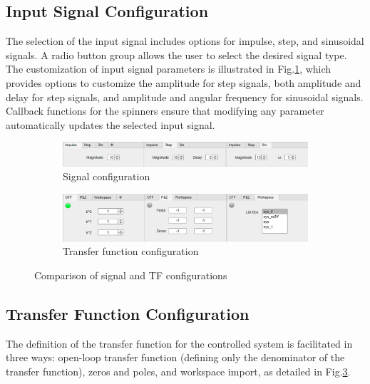 \documentclass[journal,twoside,web]{ieeecolor}
\begin{document}
\subsection{Input Signal Configuration}
The selection of the input signal includes options for impulse, step, and sinusoidal signals. A radio button group allows the user to select the desired signal type. The customization of input signal parameters is illustrated in Fig.\ref{fig:signal_config}, which provides options to customize the amplitude for step signals, both amplitude and delay for step signals, and amplitude and angular frequency for sinusoidal signals. Callback functions for the spinners ensure that modifying any parameter automatically updates the selected input signal.

\begin{figure}[!ht]
    \centering
    \begin{subfigure}[b]{0.5\textwidth}
        \centering
        \includegraphics[width=\textwidth]{Images/Signal Config2.jpg}
        \caption{Signal configuration}
        \label{fig:signal_config}
    \end{subfigure}%
    \hfill %
    \begin{subfigure}[b]{0.5\textwidth}
        \centering
        \includegraphics[width=\textwidth]{Images/TF Config.jpg}
        \caption{Transfer function configuration}
        \label{fig:tf_config}
    \end{subfigure}
    \caption{Comparison of signal and TF configurations}
    \label{fig:configs}
\end{figure}

\subsection{Transfer Function Configuration}
The definition of the transfer function for the controlled system is facilitated in three ways: open-loop transfer function (defining only the denominator of the transfer function), zeros and poles, and workspace import, as detailed in Fig.\ref{fig:configs}.
\end{document}
